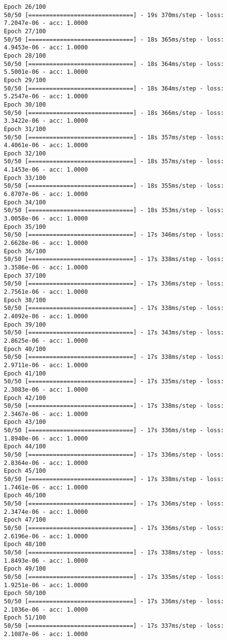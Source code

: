\documentclass[11pt]{article}
\begin{document}
\begin{Verbatim}[commandchars=\\\{\}]
Epoch 26/100
50/50 [==============================] - 19s 370ms/step - loss: 7.2047e-06 - acc: 1.0000
Epoch 27/100
50/50 [==============================] - 18s 365ms/step - loss: 4.9453e-06 - acc: 1.0000
Epoch 28/100
50/50 [==============================] - 18s 364ms/step - loss: 5.5001e-06 - acc: 1.0000
Epoch 29/100
50/50 [==============================] - 18s 364ms/step - loss: 5.2547e-06 - acc: 1.0000
Epoch 30/100
50/50 [==============================] - 18s 366ms/step - loss: 3.3422e-06 - acc: 1.0000
Epoch 31/100
50/50 [==============================] - 18s 357ms/step - loss: 4.4061e-06 - acc: 1.0000
Epoch 32/100
50/50 [==============================] - 18s 357ms/step - loss: 4.1453e-06 - acc: 1.0000
Epoch 33/100
50/50 [==============================] - 18s 355ms/step - loss: 6.8707e-06 - acc: 1.0000
Epoch 34/100
50/50 [==============================] - 18s 353ms/step - loss: 3.0058e-06 - acc: 1.0000
Epoch 35/100
50/50 [==============================] - 17s 346ms/step - loss: 2.6628e-06 - acc: 1.0000
Epoch 36/100
50/50 [==============================] - 17s 338ms/step - loss: 3.3586e-06 - acc: 1.0000
Epoch 37/100
50/50 [==============================] - 17s 336ms/step - loss: 2.7561e-06 - acc: 1.0000
Epoch 38/100
50/50 [==============================] - 17s 338ms/step - loss: 2.4092e-06 - acc: 1.0000
Epoch 39/100
50/50 [==============================] - 17s 343ms/step - loss: 2.8625e-06 - acc: 1.0000
Epoch 40/100
50/50 [==============================] - 17s 338ms/step - loss: 2.9711e-06 - acc: 1.0000
Epoch 41/100
50/50 [==============================] - 17s 335ms/step - loss: 2.3083e-06 - acc: 1.0000
Epoch 42/100
50/50 [==============================] - 17s 338ms/step - loss: 2.3467e-06 - acc: 1.0000
Epoch 43/100
50/50 [==============================] - 17s 336ms/step - loss: 1.8940e-06 - acc: 1.0000
Epoch 44/100
50/50 [==============================] - 17s 336ms/step - loss: 2.8364e-06 - acc: 1.0000
Epoch 45/100
50/50 [==============================] - 17s 338ms/step - loss: 1.7461e-06 - acc: 1.0000
Epoch 46/100
50/50 [==============================] - 17s 336ms/step - loss: 2.3474e-06 - acc: 1.0000
Epoch 47/100
50/50 [==============================] - 17s 336ms/step - loss: 2.6196e-06 - acc: 1.0000
Epoch 48/100
50/50 [==============================] - 17s 338ms/step - loss: 1.8493e-06 - acc: 1.0000
Epoch 49/100
50/50 [==============================] - 17s 335ms/step - loss: 1.9251e-06 - acc: 1.0000
Epoch 50/100
50/50 [==============================] - 17s 336ms/step - loss: 2.1036e-06 - acc: 1.0000
Epoch 51/100
50/50 [==============================] - 17s 337ms/step - loss: 2.1087e-06 - acc: 1.0000

\end{Verbatim}
\end{document}
